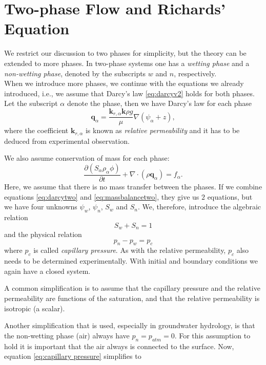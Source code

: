 \documentclass[../Main/main.tex]{subfiles}
\begin{document}
\section{Two-phase Flow and Richards' Equation}
\label{sec:TwoPhase}

We restrict our discussion to two phases for simplicity, but the theory can be extended to more phases. In two-phase systems one has a \emph{wetting phase} and a \emph{non-wetting phase}, denoted by the subscripts $w$ and $n$, respectively. \\
When we introduce more phases, we continue with the equations we already introduced, i.e., we assume that Darcy's law  \eqref{eq:darcyv2} holds for both phases. Let the subscript $\alpha$ denote the phase, then we have Darcy's law for each phase
\begin{equation}\label{eq:darcytwo}
	\bm{q}_{\alpha} = \frac{\bm{k}_{r,\alpha}\bm{k}\rho g}{\mu}\nabla(\psi_{\alpha} + z),
\end{equation}
where the coefficient $\bm{k}_{r,\alpha}$ is known as \emph{relative permeability} and it has to be deduced from experimental observation. \par We also assume conservation of mass for each phase:
\begin{equation}\label{eq:massbalancetwo}
	\frac{\partial (S_{\alpha}\rho_{\alpha} \phi) }{\partial t} + \nabla \cdot (\rho \bm{q}_{\alpha}) = f_{\alpha}.
\end{equation}
Here, we assume that there is no mass transfer between the phases.
If we combine equations \eqref{eq:darcytwo} and \eqref{eq:massbalancetwo}, they give us $2$ equations, but we have four unknowns $\psi_w$, $\psi_n$, $S_w$ and $S_n$. We, therefore, introduce the algebraic relation
\begin{equation*}
	S_w + S_n = 1
\end{equation*}
and the physical relation
\begin{equation}\label{eq:capillary pressure}
	p_n-p_w = p_c
\end{equation}
where $p_c$ is called \emph{capillary pressure}. As with the relative permeability, $p_c$ also needs to be determined experimentally.
With initial and boundary conditions we again have a closed system.\par
A common simplification is to assume that the capillary pressure and the relative permeability are functions of the saturation, and that the relative permeability is isotropic (a scalar). \par
Another simplification that is used, especially in groundwater hydrology, is that the non-wetting phase (air) always have $p_n = p_{atm}=0$. For this assumption to hold it is important that the air always is connected to the surface. Now, equation \eqref{eq:capillary pressure} simplifies to
\end{document}
